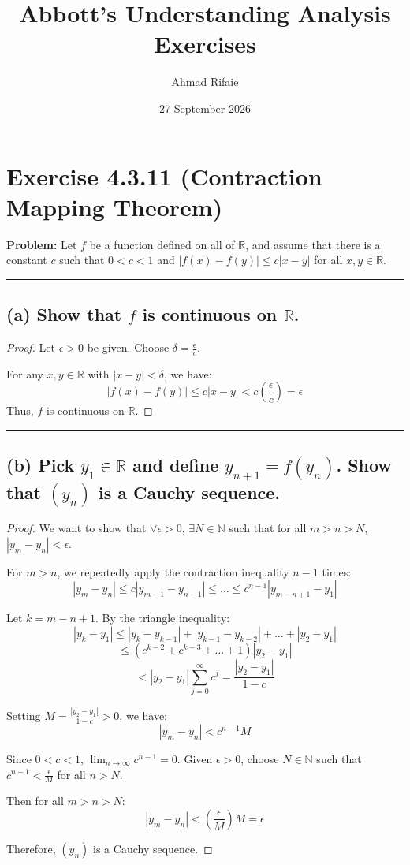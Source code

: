 \documentclass{article}
\title{Abbott's Understanding Analysis Exercises}
\author{Ahmad Rifaie}
\date{27 September 2026}
\begin{document}
\maketitle

\section*{Exercise 4.3.11 (Contraction Mapping Theorem)}

\noindent\textbf{Problem:} Let $f$ be a function defined on all of $\mathbb{R}$, and assume that there is a constant $c$ such that $0 < c < 1$ and $|f(x) - f(y)| \le c|x - y|$ for all $x, y \in \mathbb{R}$.

\vspace{0.5em}
\hrule
\vspace{1em}

\subsection*{(a) Show that $f$ is continuous on $\mathbb{R}$.}

\begin{proof}
Let $\epsilon > 0$ be given. Choose $\delta = \frac{\epsilon}{c}$.  

For any $x, y \in \mathbb{R}$ with $|x - y| < \delta$, we have:
\[
|f(x) - f(y)| \le c|x - y| < c\left(\frac{\epsilon}{c}\right) = \epsilon
\]
Thus, $f$ is continuous on $\mathbb{R}$.
\end{proof}

\vspace{0.5em}
\hrule
\vspace{1em}

\subsection*{(b) Pick $y_1 \in \mathbb{R}$ and define $y_{n+1} = f(y_n)$. Show that $(y_n)$ is a Cauchy sequence.}

\begin{proof}
We want to show that $\forall \epsilon > 0$, $\exists N \in \mathbb{N}$ such that for all $m > n > N$, $|y_m - y_n| < \epsilon$.

\medskip
For $m > n$, we repeatedly apply the contraction inequality $n - 1$ times:
\[
|y_m - y_n| \le c|y_{m-1} - y_{n-1}| \le \dots \le c^{n-1}|y_{m-n+1} - y_1|
\]

Let $k = m - n + 1$. By the triangle inequality:
\[
|y_k - y_1| \le |y_k - y_{k-1}| + |y_{k-1} - y_{k-2}| + \dots + |y_2 - y_1|
\]
\[
\le (c^{k-2} + c^{k-3} + \dots + 1)|y_2 - y_1|
\]
\[
< |y_2 - y_1| \sum_{j=0}^{\infty} c^j = \frac{|y_2 - y_1|}{1 - c}
\]

Setting $M = \frac{|y_2 - y_1|}{1 - c} > 0$, we have:
\[
|y_m - y_n| < c^{n-1} M
\]

Since $0 < c < 1$, $\lim_{n \to \infty} c^{n-1} = 0$. Given $\epsilon > 0$, choose $N \in \mathbb{N}$ such that $c^{n-1} < \frac{\epsilon}{M}$ for all $n > N$. 

Then for all $m > n > N$:
\[
|y_m - y_n| < \left(\frac{\epsilon}{M}\right) M = \epsilon
\]

Therefore, $(y_n)$ is a Cauchy sequence.
\end{proof}
\end{document}
